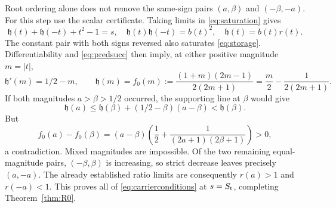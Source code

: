 Root ordering alone does not remove the same-sign pairs
\((a,\beta)\) and \((-\beta,-a)\). For this step use the scalar
certificate. Taking limits in \eqref{eq:saturation} gives
\[
 \mathfrak h(t)+\mathfrak h(-t)+t^2-1=s,\quad
 \mathfrak h(t)\mathfrak h(-t)=b(t)^2,\quad \mathfrak h(t)=b(t)r(t).
\]
The constant pair with both signs reversed also saturates
\eqref{eq:storage}. Differentiability and \eqref{eq:predsucc}
then imply, at either positive magnitude \(m=|t|\),
\[
 \mathfrak h'(m)=1/2-m,\qquad
 \mathfrak h(m)=f_0(m):=\frac{(1+m)(2m-1)}{2(2m+1)}
                 =\frac m2-\frac1{2(2m+1)}.
\]
If both magnitudes \(a>\beta>1/2\) occurred, the supporting line
at \(\beta\) would give
\[
 \mathfrak h(a)\le \mathfrak h(\beta)+(1/2-\beta)(a-\beta)<\mathfrak h(\beta).
\]
But
\[
 f_0(a)-f_0(\beta)
 =(a-\beta)\left(\frac12+\frac1{(2a+1)(2\beta+1)}\right)>0,
\]
a contradiction. Mixed magnitudes are impossible. Of the two
remaining equal-magnitude pairs, \((-\beta,\beta)\) is increasing,
so strict decrease leaves precisely \((a,-a)\).
The already established ratio limits are consequently
\(r(a)>1\) and \(r(-a)<1\). This proves all of
\eqref{eq:carrierconditions} at \(s=S_{\mathrm t}\), completing
Theorem~\ref{thm:R0}.
